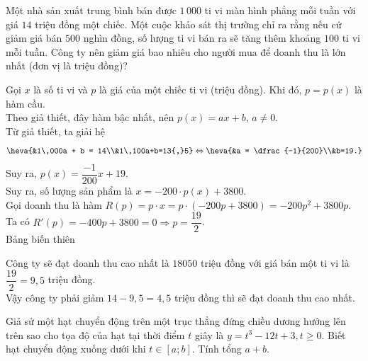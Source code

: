 \begin{bt}%

	Một nhà sản xuất trung bình bán được $1\,000$ ti vi màn hình phẳng mỗi tuần với giá $14$ triệu đồng một chiếc. Một cuộc khảo sát thị trường chỉ ra rằng nếu cứ giảm giá bán $500$ nghìn đồng, số lượng ti vi bán ra sẽ tăng thêm khoảng $100$ ti vi mỗi tuần. Công ty nên giảm giá bao nhiêu cho người mua để doanh thu là lớn nhất (đơn vị là triệu đồng)?
	
	\loigiai
	{
		Gọi $x$ là số ti vi và $p$ là giá của một chiếc ti vi (triệu đồng). Khi đó, $p=p(x)$ là hàm cầu.\\
		Theo giả thiết, đây hàm bậc nhất, nên $p(x) = ax + b$, $a \ne 0$.\\
		Từ giả thiết, ta giải hệ
		$$\heva{&1\,000a + b = 14\\&1\,100a+b=13{,}5} \Leftrightarrow \heva{&a = \dfrac{-1}{200}\\&b=19.}$$
		Suy ra, $p(x) = \dfrac{-1}{200}x + 19$.\\
		Suy ra, số lượng sản phẩm là $x = -200\cdot p(x) + 3800$.\\
		Gọi doanh thu là hàm $R(p) = p\cdot x = p\cdot\left(-200p + 3800\right) = -200p^2+3800p$.\\
		Ta có $R'(p) = -400p + 3800 = 0 \Rightarrow p = \dfrac{19}{2}$.\\
		Bảng biến thiên
		\begin{center}
			\begin{center}
			\end{center}
		\end{center}
		Công ty sẽ đạt doanh thu cao nhất là $18050$ triệu đồng với giá bán một ti vi là $\dfrac{19}{2} = 9{,}5$ triệu đồng.\\
		Vậy công ty phải giảm $14-9{,}5 = 4{,}5$ triệu đồng thì sẽ đạt doanh thu cao nhất.
	}
\end{bt}

\begin{bt}%
	 Giả sử một hạt chuyển động trên một trục thẳng đứng chiều dương hướng lên trên sao cho tọa độ của hạt tại thời điểm $ t $ giây là $ y=t^3-12t+3, t\ge 0 $. Biết hạt chuyển động xuống dưới khi $ t\in \left[a;b\right] $. Tính tổng $ a+b $.
	 
\end{bt}

